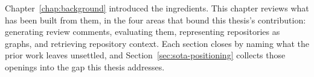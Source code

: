 %
%

Chapter~\ref{chap:background} introduced the ingredients. This chapter reviews what
has been built from them, in the four areas that bound this thesis's contribution:
generating review comments, evaluating them, representing repositories as graphs,
and retrieving repository context. Each section closes by naming what the prior
work leaves unsettled, and Section~\ref{sec:sota-positioning} collects those
openings into the gap this thesis addresses.








